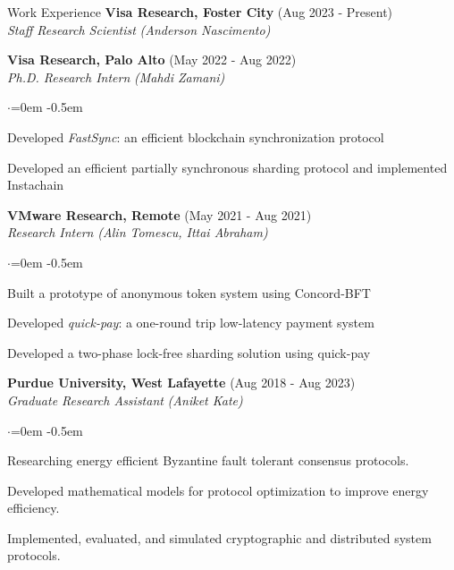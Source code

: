 \documentclass{resume}
\begin{document}
\begin{rSection}{Work Experience}
\label{sec:orgc679fe4}
\textbf{Visa Research, Foster City}  \hfill  (Aug 2023 - Present)\\[0pt]
\emph{Staff Research Scientist}  \hfill  \emph{(Anderson Nascimento)}


\textbf{Visa Research, Palo Alto}  \hfill  (May 2022 - Aug 2022)\\[0pt]
\emph{Ph.D. Research Intern}  \hfill  \emph{(Mahdi Zamani)}
\begin{list}{$\cdot$}{\leftmargin=0em}
\itemsep -0.5em \vspace{-0.5em} %
 \item   Developed \emph{FastSync}: an efficient blockchain synchronization protocol 
 \item   Developed an efficient partially synchronous sharding protocol and implemented Instachain
\end{list}
\vspace{0.5em} %

\textbf{VMware Research, Remote}  \hfill  (May 2021 - Aug 2021)\\[0pt]
\emph{Research Intern}  \hfill  \emph{(Alin Tomescu, Ittai Abraham)}
\begin{list}{$\cdot$}{\leftmargin=0em}
\itemsep -0.5em \vspace{-0.5em} %
 \item   Built a prototype of anonymous token system using Concord-BFT 
 \item   Developed \emph{quick-pay}: a one-round trip low-latency payment system 
 \item   Developed a two-phase lock-free sharding solution using quick-pay
\end{list}
\vspace{0.5em} %

\textbf{Purdue University, West Lafayette}  \hfill  (Aug 2018 - Aug 2023)\\[0pt]
\emph{Graduate Research Assistant}  \hfill  \emph{(Aniket Kate)}
\begin{list}{$\cdot$}{\leftmargin=0em}
\itemsep -0.5em \vspace{-0.5em} %
 \item   Researching energy efficient Byzantine fault tolerant consensus protocols. 
 \item   Developed mathematical models for protocol optimization to improve energy efficiency. 
 \item   Implemented, evaluated, and simulated cryptographic and distributed system protocols.
\end{list}
\vspace{0.5em} %


\end{rSection}
\end{document}
